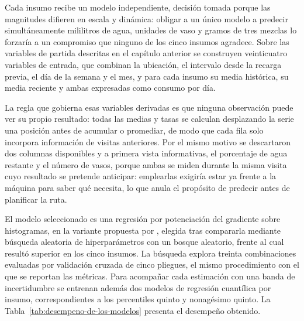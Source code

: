 Cada insumo recibe un modelo independiente, decisión tomada porque las magnitudes difieren en escala y dinámica: obligar a un único modelo a predecir simultáneamente mililitros de agua, unidades de vaso y gramos de tres mezclas lo forzaría a un compromiso que ninguno de los cinco insumos agradece. Sobre las variables de partida descritas en el capítulo anterior se construyen veinticuatro variables de entrada, que combinan la ubicación, el intervalo desde la recarga previa, el día de la semana y el mes, y para cada insumo su media histórica, su media reciente y ambas expresadas como consumo por día.

La regla que gobierna esas variables derivadas es que ninguna observación puede ver su propio resultado: todas las medias y tasas se calculan desplazando la serie una posición antes de acumular o promediar, de modo que cada fila solo incorpora información de visitas anteriores. Por el mismo motivo se descartaron dos columnas disponibles y a primera vista informativas, el porcentaje de agua restante y el número de vasos, porque ambas se miden durante la misma visita cuyo resultado se pretende anticipar: emplearlas exigiría estar ya frente a la máquina para saber qué necesita, lo que anula el propósito de predecir antes de planificar la ruta.

El modelo seleccionado es una regresión por potenciación del gradiente sobre histogramas, en la variante propuesta por \citet{friedman2001}, elegida tras compararla mediante búsqueda aleatoria de hiperparámetros con un bosque aleatorio, frente al cual resultó superior en los cinco insumos. La búsqueda explora treinta combinaciones evaluadas por validación cruzada de cinco pliegues, el mismo procedimiento con el que se reportan las métricas. Para acompañar cada estimación con una banda de incertidumbre se entrenan además dos modelos de regresión cuantílica \citep{koenker2001} por insumo, correspondientes a los percentiles quinto y nonagésimo quinto. La Tabla~\ref{tab:desempeno-de-los-modelos} presenta el desempeño obtenido.

\label{tab:desempeno-de-los-modelos}

